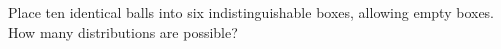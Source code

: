 Place ten identical balls into six indistinguishable boxes, allowing empty boxes. How many distributions are possible?
